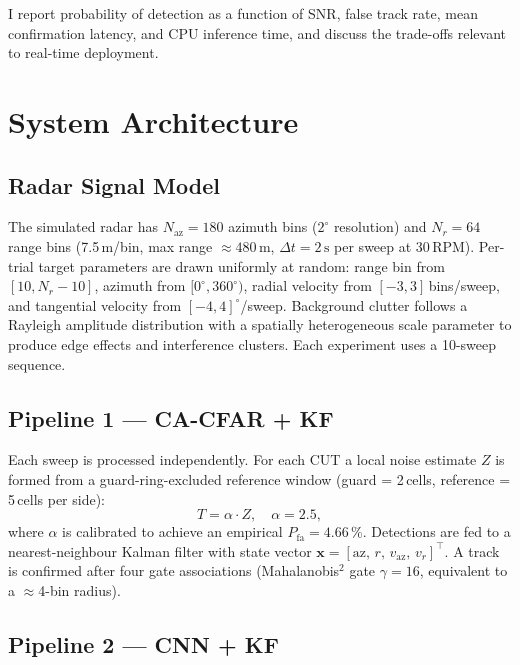 \documentclass[conference]{IEEEtran}
\begin{document}
I report probability of detection as a function of SNR, false track rate,
mean confirmation latency, and CPU inference time, and discuss the
trade-offs relevant to real-time deployment.

\section{System Architecture}

\subsection{Radar Signal Model}

The simulated radar has $N_\mathrm{az} = 180$ azimuth bins ($2^\circ$
resolution) and $N_r = 64$ range bins (7.5\,m/bin, max range $\approx
480\,\mathrm{m}$, $\Delta t = 2\,\mathrm{s}$ per sweep at 30\,RPM).
Per-trial target parameters are drawn uniformly at random: range bin from
$[10, N_r-10]$, azimuth from $[0^\circ, 360^\circ)$, radial velocity from
$[-3, 3]$\,bins/sweep, and tangential velocity from $[-4, 4]^\circ$/sweep.
Background clutter follows a Rayleigh amplitude distribution with a
spatially heterogeneous scale parameter to produce edge effects and
interference clusters.
Each experiment uses a 10-sweep sequence.

\subsection{Pipeline 1 --- CA-CFAR + KF}

Each sweep is processed independently.
For each CUT a local noise estimate $Z$ is formed from a guard-ring-excluded
reference window (guard = 2\,cells, reference = 5\,cells per side):
\begin{equation}
  T = \alpha \cdot Z, \quad \alpha = 2.5,
  \label{eq:cfar}
\end{equation}
where $\alpha$ is calibrated to achieve an empirical
$P_\mathrm{fa} = 4.66\,\%$.
Detections are fed to a nearest-neighbour Kalman filter with state vector
$\mathbf{x} = [\mathrm{az},\, r,\, v_\mathrm{az},\, v_r]^\top$.
A track is confirmed after four gate associations
(Mahalanobis$^2$ gate $\gamma = 16$, equivalent to a $\approx$4-bin radius).

\subsection{Pipeline 2 --- CNN + KF}
\end{document}

